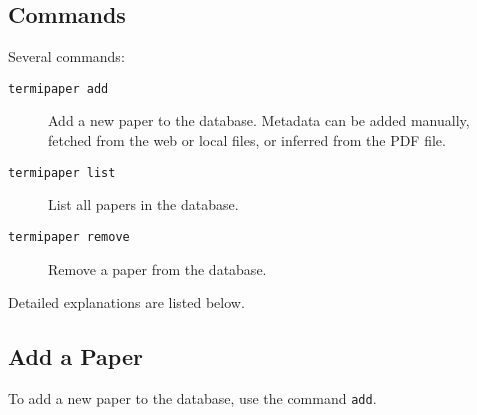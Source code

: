 \subsection{Commands}
Several commands:
\begin{description}
  \item[\texttt{termipaper add}] Add a new paper to the database.
    Metadata can be added manually, fetched from the web or local files,
    or inferred from the PDF file.
  \item[\texttt{termipaper list}] List all papers in the database.
  \item[\texttt{termipaper remove}] Remove a paper from the database.
\end{description}

Detailed explanations are listed below.

\subsection{Add a Paper}\label{subsec:termipaper-add}
To add a new paper to the database, use the command \texttt{add}.

